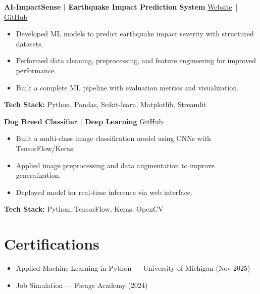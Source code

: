 \documentclass[10.5pt]{article}
\begin{document}
\vspace{2pt}

\textbf{AI-ImpactSense | Earthquake Impact Prediction System} \hfill
\href{https://ai-impactsense-jghxyvcnxdftwkqjgr3imr.streamlit.app/}{Website} \,|\, 
\href{https://github.com/anushkaaa26}{GitHub} \\
\begin{itemize}
    \item Developed ML models to predict earthquake impact severity with structured datasets.
    \item Performed data cleaning, preprocessing, and feature engineering for improved performance.
    \item Built a complete ML pipeline with evaluation metrics and visualization.
\end{itemize}
\textbf{Tech Stack:} Python, Pandas, Scikit-learn, Matplotlib, Streamlit

\vspace{2pt}

\textbf{Dog Breed Classifier | Deep Learning} \hfill
\href{https://github.com/anushkaaa26/dog_breed_identification}{GitHub} \\
\begin{itemize}
    \item Built a multi-class image classification model using CNNs with TensorFlow/Keras.
    \item Applied image preprocessing and data augmentation to improve generalization.
    \item Deployed model for real-time inference via web interface.
\end{itemize}
\textbf{Tech Stack:} Python, TensorFlow, Keras, OpenCV

\section*{Certifications}
\begin{itemize}
    \item Applied Machine Learning in Python — University of Michigan (Nov 2025)
    \item Job Simulation — Forage Academy (2024)
\end{itemize}
\end{document}
